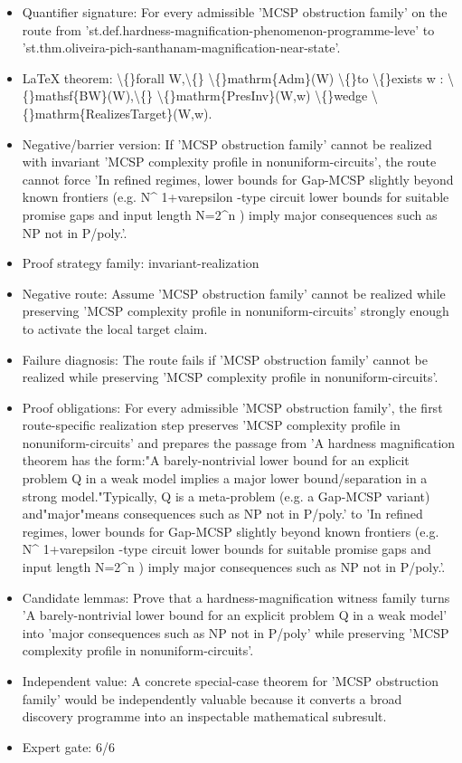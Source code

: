 \documentclass[11pt]{article}
\begin{document}
\begin{itemize}
\item Quantifier signature: For every admissible 'MCSP obstruction family' on the route from 'st.def.hardness-magnification-phenomenon-programme-leve' to 'st.thm.oliveira-pich-santhanam-magnification-near-state'.
\item LaTeX theorem: \textbackslash\{\}forall W,\textbackslash\{\} \textbackslash\{\}mathrm\{Adm\}(W) \textbackslash\{\}to \textbackslash\{\}exists w : \textbackslash\{\}mathsf\{BW\}(W),\textbackslash\{\} \textbackslash\{\}mathrm\{PresInv\}(W,w) \textbackslash\{\}wedge \textbackslash\{\}mathrm\{RealizesTarget\}(W,w).
\item Negative/barrier version: If 'MCSP obstruction family' cannot be realized with invariant 'MCSP complexity profile in nonuniform-circuits', the route cannot force 'In refined regimes, lower bounds for Gap-MCSP slightly beyond known frontiers (e.g. N\textasciicircum{} 1+varepsilon -type circuit lower bounds for suitable promise gaps and input length N=2\textasciicircum{}n ) imply major consequences such as NP not in P/poly.'.
\item Proof strategy family: invariant-realization
\item Negative route: Assume 'MCSP obstruction family' cannot be realized while preserving 'MCSP complexity profile in nonuniform-circuits' strongly enough to activate the local target claim.
\item Failure diagnosis: The route fails if 'MCSP obstruction family' cannot be realized while preserving 'MCSP complexity profile in nonuniform-circuits'.
\item Proof obligations: For every admissible 'MCSP obstruction family', the first route-specific realization step preserves 'MCSP complexity profile in nonuniform-circuits' and prepares the passage from 'A hardness magnification theorem has the form:"A barely-nontrivial lower bound for an explicit problem Q in a weak model implies a major lower bound/separation in a strong model."Typically, Q is a meta-problem (e.g. a Gap-MCSP variant) and"major"means consequences such as NP not in P/poly.' to 'In refined regimes, lower bounds for Gap-MCSP slightly beyond known frontiers (e.g. N\textasciicircum{} 1+varepsilon -type circuit lower bounds for suitable promise gaps and input length N=2\textasciicircum{}n ) imply major consequences such as NP not in P/poly.'.
\item Candidate lemmas: Prove that a hardness-magnification witness family turns 'A barely-nontrivial lower bound for an explicit problem Q in a weak model' into 'major consequences such as NP not in P/poly' while preserving 'MCSP complexity profile in nonuniform-circuits'.
\item Independent value: A concrete special-case theorem for 'MCSP obstruction family' would be independently valuable because it converts a broad discovery programme into an inspectable mathematical subresult.
\item Expert gate: 6/6
\end{itemize}
\end{document}

